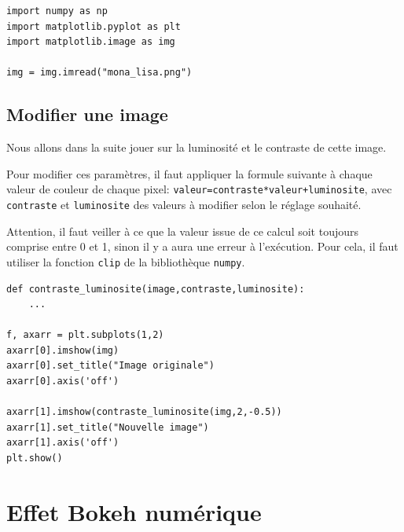  
\begin{verbatim}
import numpy as np
import matplotlib.pyplot as plt
import matplotlib.image as img

img = img.imread("mona_lisa.png")
\end{verbatim}


\subsection{Modifier une image}

Nous allons dans la suite jouer sur la luminosité et le contraste de cette image.

Pour modifier ces paramètres, il faut appliquer la formule suivante à chaque valeur de couleur de chaque pixel: \verb?valeur=contraste*valeur+luminosite?, avec 
\verb?contraste? et \verb?luminosite? des valeurs à modifier selon le réglage souhaité.

Attention, il faut veiller à ce que la valeur issue de ce calcul soit toujours comprise entre 0 et 1, sinon il y a aura une erreur à l'exécution. Pour cela, il faut utiliser la fonction \verb?clip? de la bibliothèque \verb?numpy?.


\begin{verbatim}
def contraste_luminosite(image,contraste,luminosite):
    ...

f, axarr = plt.subplots(1,2)
axarr[0].imshow(img)
axarr[0].set_title("Image originale")
axarr[0].axis('off')

axarr[1].imshow(contraste_luminosite(img,2,-0.5))
axarr[1].set_title("Nouvelle image")
axarr[1].axis('off')
plt.show()
\end{verbatim}

\section{Effet Bokeh numérique}

